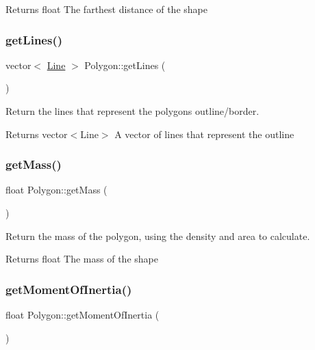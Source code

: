 \begin{DoxyReturn}{Returns}
float The farthest distance of the shape 
\end{DoxyReturn}
\mbox{\label{class_polygon_acbeaa5a9990ee704fdfa766d4a34b86c}} 
\subsubsection{\texorpdfstring{getLines()}{getLines()}}
{\footnotesize\ttfamily vector$<$ \mbox{\hyperlink{class_line}{Line}} $>$ Polygon\+::get\+Lines (\begin{DoxyParamCaption}{ }\end{DoxyParamCaption})}



Return the lines that represent the polygon\textquotesingle{}s outline/border. 

\begin{DoxyReturn}{Returns}
vector$<$\+Line$>$ A vector of lines that represent the outline 
\end{DoxyReturn}
\mbox{\label{class_polygon_a9c5d5b2df7caf0dc80b00fbcae0a74e2}} 
\subsubsection{\texorpdfstring{getMass()}{getMass()}}
{\footnotesize\ttfamily float Polygon\+::get\+Mass (\begin{DoxyParamCaption}{ }\end{DoxyParamCaption})}



Return the mass of the polygon, using the density and area to calculate. 

\begin{DoxyReturn}{Returns}
float The mass of the shape 
\end{DoxyReturn}
\mbox{\label{class_polygon_af029d3b7c0e523ab07b376a193b6c7a3}} 
\subsubsection{\texorpdfstring{getMomentOfInertia()}{getMomentOfInertia()}}
{\footnotesize\ttfamily float Polygon\+::get\+Moment\+Of\+Inertia (\begin{DoxyParamCaption}{ }\end{DoxyParamCaption})}




